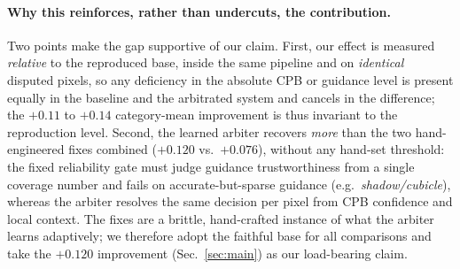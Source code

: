 \documentclass[sn-basic]{sn-jnl}
\begin{document}
\paragraph{Why this reinforces, rather than undercuts, the contribution.}
Two points make the gap supportive of our claim. First, our effect is measured
\emph{relative} to the reproduced base, inside the same pipeline and on \emph{identical}
disputed pixels, so any deficiency in the absolute CPB or guidance level is present
equally in the baseline and the arbitrated system and cancels in the difference; the
$+0.11$ to $+0.14$ category-mean improvement is thus invariant to the reproduction level.
Second, the learned arbiter recovers \emph{more} than the two hand-engineered fixes
combined ($+0.120$ vs.\ $+0.076$), without any hand-set threshold: the fixed reliability
gate must judge guidance trustworthiness from a single coverage number and fails on
accurate-but-sparse guidance (e.g.\ \textit{shadow/cubicle}), whereas the arbiter resolves
the same decision per pixel from CPB confidence and local context. The fixes are a
brittle, hand-crafted instance of what the arbiter learns adaptively; we therefore adopt
the faithful base for all comparisons and take the $+0.120$ improvement
(Sec.~\ref{sec:main}) as our load-bearing claim.
\end{document}

